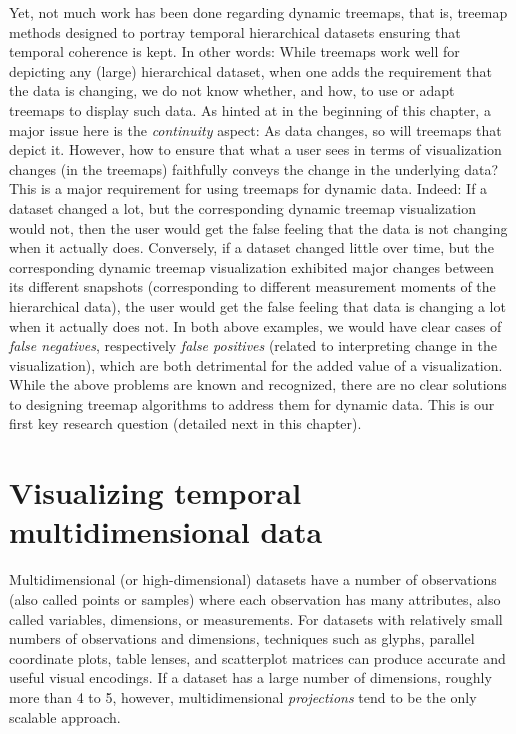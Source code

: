 Yet, not much work has been done regarding dynamic treemaps, that is, treemap methods designed to portray temporal hierarchical datasets ensuring that temporal coherence is kept. In other words: While treemaps work well for depicting any (large) hierarchical dataset, when one adds the requirement that the data is changing, we do not know whether, and how, to use or adapt treemaps to display such data. As hinted at in the beginning of this chapter, a major issue here is the \emph{continuity} aspect: As data changes, so will treemaps that depict it. However, how to ensure that what a user sees in terms of visualization changes (in the treemaps) faithfully conveys the change in the underlying data? This is a major requirement for using treemaps for dynamic data. Indeed: If a dataset changed a lot, but the corresponding dynamic treemap visualization would not, then the user would get the false feeling that the data is not changing when it actually does. Conversely, if a dataset changed little over time, but the corresponding dynamic treemap visualization exhibited major changes between its different snapshots (corresponding to different measurement moments of the hierarchical data), the user would get the false feeling that data is changing a lot when it actually does not. In both above examples, we would have clear cases of \emph{false negatives}, respectively \emph{false positives} (related to interpreting change in the visualization), which are both detrimental for the added value of a visualization. While the above problems are known and recognized, there are no clear solutions to designing treemap algorithms to address them for dynamic data. This is our first key research question (detailed next in this chapter).


\section{Visualizing temporal multidimensional data}
\label{sec:ch1_highdim}
%
Multidimensional (or high-dimensional) datasets have a number of observations (also called points or samples) where each observation has many attributes, also called variables, dimensions, or measurements. 
For datasets with relatively small numbers of observations and dimensions, techniques such as glyphs, parallel coordinate plots, table lenses, and scatterplot matrices can produce accurate and useful visual encodings.  
If a dataset has a large number of dimensions, roughly more than 4 to 5, however, multidimensional \emph{projections} tend to be the only scalable approach.  

